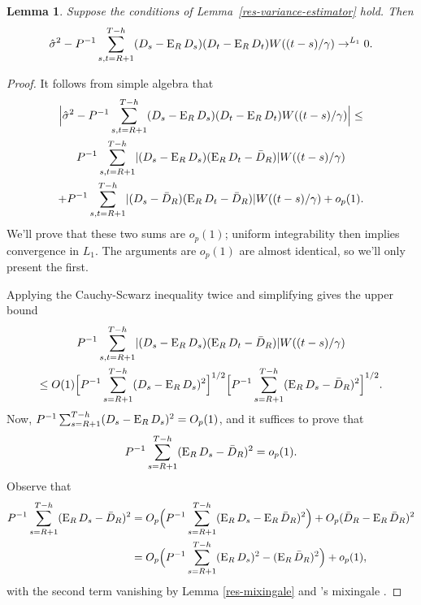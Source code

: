 \documentclass[11pt]{article}
\newtheorem{lem}{Lemma}
\newcommand{\citepos}[1]{\citeauthor{#1}'s \citeyearpar{#1}}
\begin{document}
\begin{lem}\label{lem:a6}
  Suppose the conditions of Lemma~\ref{res-variance-estimator} hold.
  Then
  \begin{equation*}
    \hat{\sigma}^2 - P^{-1} \sum_{s,t=R+1}^{T-h} (D_s - \operatorname{E}_R
    D_s) (D_t - \operatorname{E}_R D_t) W((t-s)/\gamma) \to^{L_1} 0.
  \end{equation*}
\end{lem}

\begin{proof}
   It follows from simple algebra that
\begin{multline*}
  \Big| \hat{\sigma}^2 -  P^{-1} \sum_{s,t=R+1}^{T-h} (D_s - \operatorname{E}_R
    D_s) (D_t - \operatorname{E}_R D_t) W((t-s)/\gamma) \Big| \leq\\
  P^{-1} \sum_{s,t=R+1}^{T-h} \lvert (D_s - \operatorname{E}_R D_s)(\operatorname{E}_R D_t - \bar{D}_{R}) \rvert W((t-s)/\gamma) \\ + P^{-1} \sum_{s,t=R+1}^{T-h} \lvert (D_s -
  \bar{D}_{R})(\operatorname{E}_R D_t - \bar{D}_{R}) \rvert W((t-s)/\gamma) + o_p(1).
\end{multline*}
We'll prove that these two sums are $o_p(1)$; uniform integrability
then implies convergence in $L_1$.  The arguments are $o_p(1)$ are
almost identical, so we'll only present the first.

Applying the Cauchy-Scwarz inequality twice and simplifying gives the
upper bound
\begin{multline*}
P^{-1} \sum_{s,t=R+1}^{T-h} \lvert (D_s - \operatorname{E}_R D_s)(\operatorname{E}_R D_t - \bar{D}_{R}) \rvert W((t-s)/\gamma) \\ \leq O(1) \Big[P^{-1} \sum_{s=R+1}^{T-h} (D_s - \operatorname{E}_R D_s)^2\Big]^{1/2} \Big[P^{-1} \sum_{s=R+1}^{T-h}(\operatorname{E}_R D_s - \bar{D}_{R} )^2\Big]^{1/2}.
\end{multline*}
Now,
$P^{-1} \sum_{s=R+1}^{T-h}(D_s - \operatorname{E}_R D_s)^2 = O_p(1)$, and it suffices to prove
that \[P^{-1} \sum_{s=R+1}^{T-h}(\operatorname{E}_R D_s - \bar{D}_{R} )^2 = o_p(1).\]  Observe that
\begin{align*}
  P^{-1} \sum_{s=R+1}^{T-h}(\operatorname{E}_R D_s - \bar{D}_{R} )^2 & = O_p\Big(P^{-1} \sum_{s=R+1}^{T-h}(\operatorname{E}_{R}D_s -
  \operatorname{E}_R\bar{D}_{R})^2\Big) + O_p(\bar{D}_{R} - \operatorname{E}_R\bar{D}_{R})^{2} \\
  &= O_p\Big(P^{-1} \sum_{s=R+1}^{T-h} (\operatorname{E}_RD_s)^2 - (\operatorname{E}_R\bar{D}_{R})^2\Big) +
  o_p(1),
\end{align*}
with the second term vanishing by Lemma \ref{res-mixingale} and
\citepos{Dav:93} mixingale \lln.


\end{proof}
\end{document}
